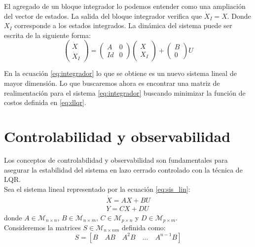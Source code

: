\documentclass[main]{subfiles}
\begin{document}
El agregado de un bloque integrador lo podemos entender como una ampliaci\'on del vector de estados. La salida del bloque integrador verifica que $\dot{X}_I = X$. Donde $X_I$ corresponde a los estados integrados. La din\'amica del sistema puede ser escrita de la siguiente forma:
\begin{equation}
\label{eq:integrador}
\left(\begin{array}{c}
\dot{X}\\
\dot{X}_I
\end{array}\right) = \left( \begin{array}{cc}
A & 0\\
Id & 0
\end{array}\right)\left(\begin{array}{c}
X\\
X_I
\end{array}\right) + \left(\begin{array}{c}
B\\
0
\end{array}\right)U
\end{equation}  
 
En la ecuaci\'on \ref{eq:integrador} lo que se obtiene es un nuevo sistema lineal de mayor dimensi\'on. Lo que buscaremos ahora es encontrar una matriz de realimentaci\'on para el sistema \ref{eq:integrador} buscando minimizar la funci\'on de costos definida en \ref{eq:dlqr}.

\section{Controlabilidad y observabilidad}

Los conceptos de controlabilidad y observabilidad son fundamentales para asegurar la estabilidad del sistema en lazo cerrado controlado con la t\'ecnica de LQR.\\

Sea el sistema lineal representado por la ecuaci\'on \ref{eq:sis_lin}:
\begin{equation}
\label{eq:sis_lin}
\begin{array}{c}
\dot{X} = AX+BU \\
Y = CX+DU
\end{array}
\end{equation}
donde $A \in \mathcal{M}_{n \times n}$, $B \in \mathcal{M}_{n \times m}$, $C \in \mathcal{M}_{p \times n}$ y $D \in \mathcal{M}_{p \times m}$.\\

Consideremos la matrices $S\in \mathcal{M}_{n \times nm}$  definida como:
\begin{equation}
\label{eq:contr}
S = [B \quad AB \quad A^2B \quad ...\quad A^{n-1}B]
\end{equation}
\end{document}
